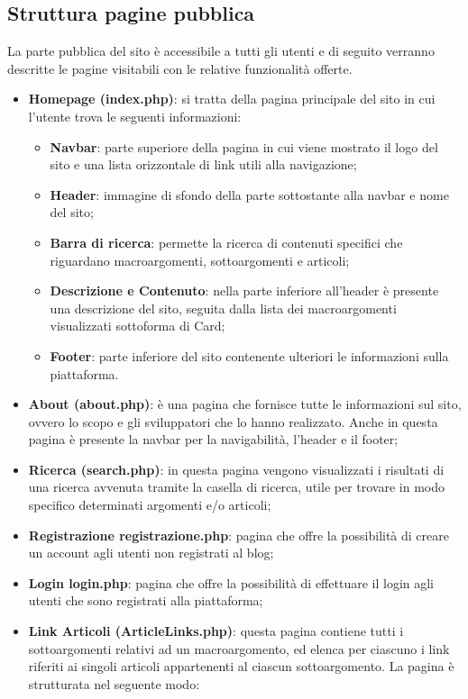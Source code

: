 \documentclass[12pt]{article}
\begin{document}
	\subsection{Struttura pagine pubblica}
		La parte pubblica del sito è accessibile a tutti gli utenti e di seguito verranno descritte le pagine visitabili con le relative funzionalità offerte.
		\begin{itemize}
				\item \textbf{Homepage (index.php)}: si tratta della pagina principale del sito in cui l'utente trova le seguenti informazioni:
				\begin{itemize}
						\item \textbf{Navbar}: parte superiore della pagina in cui viene mostrato il logo del sito e una lista orizzontale di link utili alla navigazione;
						\item \textbf{Header}: immagine di sfondo della parte sottostante alla navbar e nome del sito;
						\item \textbf{Barra di ricerca}: permette la ricerca di contenuti specifici che riguardano macroargomenti, sottoargomenti e articoli;
						\item \textbf{Descrizione e Contenuto}: nella parte inferiore all'header è presente una descrizione del sito, seguita dalla lista dei macroargomenti visualizzati sottoforma di Card;
						\item \textbf{Footer}: parte inferiore del sito contenente ulteriori le informazioni sulla piattaforma.
				\end{itemize}
			\item \textbf{About (about.php)}: è una pagina che fornisce tutte le informazioni sul sito, ovvero lo scopo e gli sviluppatori che lo hanno realizzato. Anche in questa pagina è presente la navbar per la navigabilità, l'header e il footer;
			\item \textbf{Ricerca (search.php)}: in questa pagina vengono visualizzati i risultati di una ricerca avvenuta tramite la casella di ricerca, utile per trovare in modo specifico determinati argomenti e/o articoli;
			\item \textbf{Registrazione {registrazione.php}}: pagina che offre la possibilità di creare un account agli utenti non registrati al blog;
			\item \textbf{Login {login.php}}: pagina che offre la possibilità di effettuare il login agli utenti che sono registrati alla piattaforma;
			\item \textbf{Link Articoli (ArticleLinks.php)}: questa pagina contiene tutti i sottoargomenti relativi ad un macroargomento, ed elenca per ciascuno i link riferiti ai singoli articoli appartenenti al ciascun sottoargomento. La pagina è strutturata nel seguente modo:

\end{itemize}
\end{document}
